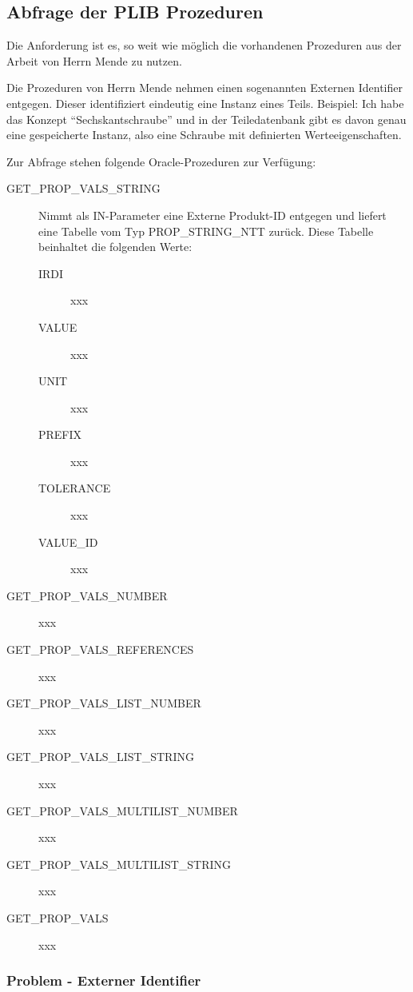 \subsection{Abfrage der PLIB Prozeduren}

Die Anforderung ist es, so weit wie möglich die vorhandenen Prozeduren aus der Arbeit von Herrn Mende zu nutzen. 

Die Prozeduren von Herrn Mende nehmen einen sogenannten Externen Identifier entgegen. Dieser identifiziert eindeutig eine Instanz eines Teils. 
Beispiel: Ich habe das Konzept \enquote{Sechskantschraube} und in der Teiledatenbank gibt es davon genau eine gespeicherte Instanz, also eine Schraube mit definierten Werteeigenschaften. 

Zur Abfrage stehen folgende Oracle-Prozeduren zur Verfügung:

\begin{description}
\item[GET\_PROP\_VALS\_STRING] Nimmt als IN-Parameter eine Externe Produkt-ID entgegen und liefert eine Tabelle vom Typ PROP\_STRING\_NTT zurück. 
Diese Tabelle beinhaltet die folgenden Werte: 
  \begin{description}
  \item[IRDI] xxx
  \item[VALUE] xxx
  \item[UNIT] xxx
  \item[PREFIX] xxx
  \item[TOLERANCE] xxx
  \item[VALUE\_ID] xxx
  \end{description}


\item[GET\_PROP\_VALS\_NUMBER]  xxx
\item[GET\_PROP\_VALS\_REFERENCES]  xxx
\item[GET\_PROP\_VALS\_LIST\_NUMBER] xxx
\item[GET\_PROP\_VALS\_LIST\_STRING] xxx
\item[GET\_PROP\_VALS\_MULTILIST\_NUMBER] xxx
\item[GET\_PROP\_VALS\_MULTILIST\_STRING]  xxx
\item[GET\_PROP\_VALS] xxx  
\end{description}


\subsubsection{Problem - Externer Identifier}

